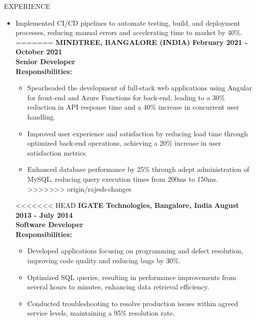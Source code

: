 \documentclass{resume} %
\begin{document}
\begin{rSection}{EXPERIENCE}
\begin{flushleft}
\begin{itemize}
\begin{itemize}
                                    \item Implemented CI/CD pipelines to automate testing, build, and deployment processes, reducing manual errors and accelerating time to market by 40\%.
=======
            \textbf{MINDTREE, BANGALORE (INDIA)} \hfill \textbf{February 2021 {-} October 2021} \\
            \textbf{Senior Developer} \\
            \vspace{1em}
            \textbf{Responsibilities:} \\
            \begin{itemize}
                                    \item Spearheaded the development of full{-}stack web applications using Angular for front{-}end and Azure Functions for back{-}end, leading to a 30\% reduction in API response time and a 40\% increase in concurrent user handling.
                                    \item Improved user experience and satisfaction by reducing load time through optimized back{-}end operations, achieving a 20\% increase in user satisfaction metrics.
                                    \item Enhanced database performance by 25\% through adept administration of MySQL, reducing query execution times from 200ms to 150ms.
>>>>>>> origin/rajesh-changes
                            \end{itemize}
            \vspace{0.5em}
<<<<<<< HEAD
            \textbf{IGATE Technologies, Bangalore, India} \hfill \textbf{August 2013 {-} July 2014} \\
            \textbf{Software Developer} \\
            \vspace{1em}
            \textbf{Responsibilities:} \\
            \begin{itemize}
                                    \item Developed applications focusing on programming and defect resolution, improving code quality and reducing bugs by 30\%.
                                    \item Optimized SQL queries, resulting in performance improvements from several hours to minutes, enhancing data retrieval efficiency.
                                    \item Conducted troubleshooting to resolve production issues within agreed service levels, maintaining a 95\% resolution rate.

\end{itemize}
\end{itemize}
\end{itemize}
\end{flushleft}
\end{rSection}
\end{document}

